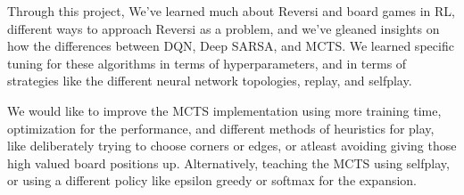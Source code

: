 Through this project, We've learned much about Reversi and board games in RL, different ways to approach Reversi as a problem, and we've gleaned insights on how the differences between DQN, Deep SARSA, and MCTS. We learned specific tuning for these algorithms in terms of hyperparameters, and in terms of strategies like the different neural network topologies, replay, and selfplay.

We would like to improve the MCTS implementation using more training time, optimization for the performance, and different methods of heuristics for play, like deliberately trying to choose corners or edges, or atleast avoiding giving those high valued board positions up. Alternatively, teaching the MCTS using selfplay, or using a different policy like epsilon greedy or softmax for the expansion.